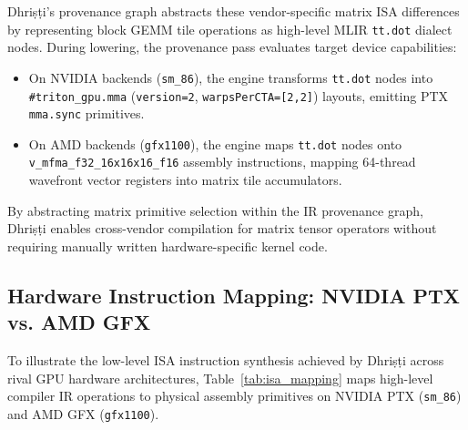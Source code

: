\documentclass[10pt,journal,compsoc]{IEEEtran}
\begin{document}
Dhri\d{s}\d{t}i's provenance graph abstracts these vendor-specific matrix ISA differences by representing block GEMM tile operations as high-level MLIR \texttt{tt.dot} dialect nodes. During lowering, the provenance pass evaluates target device capabilities:
\begin{itemize}
    \item On NVIDIA backends (\texttt{sm\_86}), the engine transforms \texttt{tt.dot} nodes into \texttt{\#triton\_gpu.mma} (\texttt{version=2}, \texttt{warpsPerCTA=[2,2]}) layouts, emitting PTX \texttt{mma.sync} primitives.
    \item On AMD backends (\texttt{gfx1100}), the engine maps \texttt{tt.dot} nodes onto \texttt{v\_mfma\_f32\_16x16x16\_f16} assembly instructions, mapping 64-thread wavefront vector registers into matrix tile accumulators.
\end{itemize}

By abstracting matrix primitive selection within the IR provenance graph, Dhri\d{s}\d{t}i enables cross-vendor compilation for matrix tensor operators without requiring manually written hardware-specific kernel code.


\subsection{Hardware Instruction Mapping: NVIDIA PTX vs. AMD GFX}
To illustrate the low-level ISA instruction synthesis achieved by Dhri\d{s}\d{t}i across rival GPU hardware architectures, Table~\ref{tab:isa_mapping} maps high-level compiler IR operations to physical assembly primitives on NVIDIA PTX (\texttt{sm\_86}) and AMD GFX (\texttt{gfx1100}).

\begin{table}[htbp]
\centering
\caption{Cross-Vendor Instruction Set Architecture (ISA) Mapping for Core Memory and Compute Primitives.}
\label{tab:isa_mapping}
\end{table}
\end{document}

